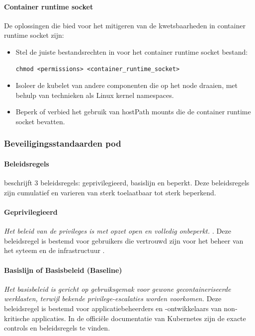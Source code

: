 \paragraph{Container runtime socket}
De oplossingen die \textcite{KubernetesDocs-2023} bied voor het mitigeren van de kwetsbaarheden in container runtime socket zijn:
\begin{itemize}
    \item Stel de juiste bestandsrechten in voor het container runtime socket bestand:
\begin{lstlisting}[language=tex, caption={Opzetten juiste bestandsrechten voor container runtime socket}]
chmod <permissions> <container_runtime_socket>
\end{lstlisting}
    \item Isoleer de kubelet van andere componenten die op het node draaien, met behulp van technieken als Linux kernel namespaces.
    \item Beperk of verbied het gebruik van hostPath mounts die de container runtime socket bevatten.
\end{itemize}

\subsubsection{Beveiligingsstandaarden pod}
\paragraph{Beleidsregels}
\textcite{KubernetesDocs-2023} beschrijft 3 beleidsregels: geprivilegieerd, basislijn en beperkt. Deze beleidsregels zijn cumulatief en varieren van sterk toelaatbaar tot sterk beperkend. 

\paragraph{Geprivilegieerd}
\textit{Het beleid van de privileges is met opzet open en volledig onbeperkt. \autocite{KubernetesDocs-2023}}.
Deze beleidsregel is bestemd voor gebruikers die vertrouwd zijn voor het beheer van het syteem en de infrastructuur \autocite{KubernetesDocs-2023}. 

\paragraph{Basislijn of Basisbeleid (Baseline)}
\textit{Het basisbeleid is gericht op gebruiksgemak voor gewone gecontaineriseerde werklasten, terwijl bekende privilege-escalaties worden voorkomen. \autocite{KubernetesDocs-2023}}
Deze beleidsregel is bestemd voor applicatiebeheerders en -ontwikkelaars van non-kritische applicaties.
In de officiële documentatie van Kubernetes zijn de exacte controls en beleidsregels te vinden.

